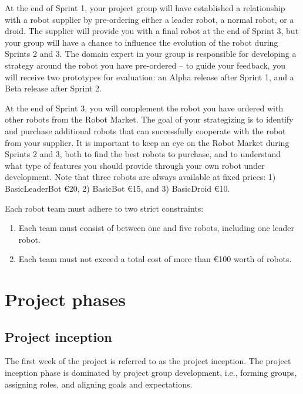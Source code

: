 \documentclass{scrreprt}
\begin{document}
At the end of Sprint 1, your project group will have established a relationship with a robot supplier by pre-ordering either a leader robot, a normal robot, or a droid. The supplier will provide you with a final robot at the end of Sprint 3, but your group will have a chance to influence the evolution of the robot during Sprints 2 and 3. The domain expert in your group is responsible for developing a strategy around the robot you have pre-ordered -- to guide your feedback, you will receive two prototypes for evaluation: an Alpha release after Sprint 1, and a Beta release after Sprint 2.

At the end of Sprint 3, you will complement the robot you have ordered with other robots from the Robot Market. The goal of your strategizing is to identify and purchase additional robots that can successfully cooperate with the robot from your supplier. It is important to keep an eye on the Robot Market during Sprints 2 and 3, both to find the best robots to purchase, and to understand what type of features you should provide through your own robot under development. Note that three robots are always available at fixed prices: 1) BasicLeaderBot \euro 20, 2) BasicBot \euro 15, and 3) BasicDroid \euro 10.

Each robot team must adhere to two strict constraints: 

\begin{enumerate}
\item Each team must consist of between one and five robots, including one leader robot.
\item Each team must not exceed a total cost of more than \euro 100 worth of robots.
\end{enumerate}

\chapter{Project phases}

\section{Project inception}
The first week of the project is referred to as the project inception. The project inception phase is dominated by project group development, i.e., forming groups, assigning roles, and aligning goals and expectations.
\end{document}

